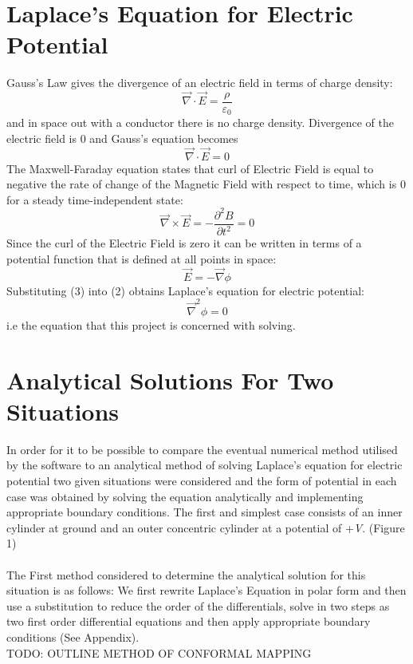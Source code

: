 \documentclass{article}
\begin{document}
\section{Laplace's Equation for Electric Potential}
Gauss's Law gives the divergence of an electric field in terms of charge density: 
\begin{equation}
\vec{\nabla} \cdot \vec{E} = \frac{\rho}{\varepsilon_{0}}
\label{1}
\end{equation}
and in space out with a conductor there is no charge density.  Divergence of the electric field is 0 and Gauss's equation becomes
\begin{equation}
\vec{\nabla} \cdot \vec{E} =0
\label{2}
\end{equation}
The Maxwell-Faraday equation states that curl of Electric Field is equal to negative the rate of change of the Magnetic Field with respect to time, which is 0 for a steady time-independent state:
\begin{equation}
\vec{\nabla}\times\vec{E} = -\frac{\partial^2{B}}{\partial{t}^2} = 0
\label{3}
\end{equation}
Since the curl of the Electric Field is zero it can be written in terms of a potential function \phi\) that is defined at all points in space:
\begin{equation}
\vec{E} = -\vec{\nabla}\phi
\label{3}
\end{equation}
Substituting (3) into (2) obtains Laplace's equation for electric potential:
\begin{equation}
\vec{\nabla}^2\phi = 0
\label{5}
\end{equation}
i.e the equation that this project is concerned with solving.
\section{Analytical Solutions For Two Situations} 
In order for it to be possible to compare the eventual numerical method utilised by the software to an analytical method of solving Laplace's equation for electric potential two given situations were considered and the form of potential in each case was obtained by solving the equation analytically and implementing appropriate boundary conditions. 
\newline The first and simplest case consists of an inner cylinder at ground and an outer concentric cylinder at a potential of +\textit{V}. (Figure 1) \\
\\
The First method considered to determine the analytical solution for this situation is as follows: We first rewrite Laplace's Equation in polar form and then use a substitution to reduce the order of the differentials, solve in two steps as two first order differential equations and then apply appropriate boundary conditions (See Appendix). \\
TODO: OUTLINE METHOD OF CONFORMAL MAPPING \\
\end{document}
